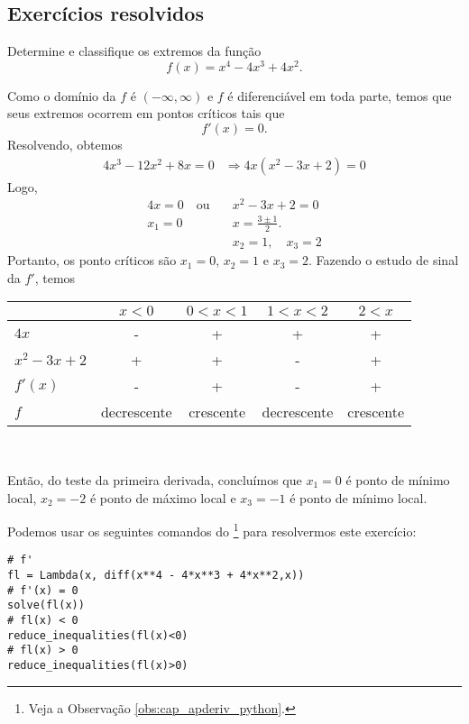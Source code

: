 \subsection{Exercícios resolvidos}


\begin{exeresol}
  Determine e classifique os extremos da função
  \begin{equation}
    f(x) = x^4 - 4x^3 + 4x^2.
  \end{equation}
\end{exeresol}
\begin{resol}
  Como o domínio da $f$ é $(-\infty, \infty)$ e $f$ é diferenciável em toda parte, temos que seus extremos ocorrem em pontos críticos tais que
  \begin{equation}
    f'(x)=0.
  \end{equation}
  Resolvendo, obtemos
  \begin{align}
    4x^3-12x^2+8x=0 &\Rightarrow 4x(x^2-3x+2)=0
  \end{align}
  Logo,
  \begin{align}
    4x=0 \quad\text{ou}\quad &x^2-3x+2=0\\
    x_1 = 0                  &x = \frac{3\pm 1}{2}. \\
                             &x_2 = 1,\quad x_3=2
  \end{align}
  Portanto, os ponto críticos são $x_1=0$, $x_2=1$ e $x_3=2$. Fazendo o estudo de sinal da $f'$, temos
  \begin{center}
    \begin{tabular}{lcccc}\hline
                 & $x<0$ & $0<x<1$ & $1<x<2$ & $2<x$ \\\hline
      $4x$       & -       &     +       &     +      &   +  \\
      $x^2-3x+2$ & +       &     +       &     -      &   +   \\
      $f'(x)$    & -       &     +       &     -      &   +   \\
      $f$        & decrescente & crescente & decrescente & crescente \\\hline
    \end{tabular}\\
  \end{center}
  Então, do teste da primeira derivada, concluímos que $x_1=0$ é ponto de mínimo local, $x_2=-2$ é ponto de máximo local e $x_3=-1$ é ponto de mínimo local.

  \ifispython
  Podemos usar os seguintes comandos do \sympy\footnote{Veja a Observação \ref{obs:cap_apderiv_python}.} para resolvermos este exercício:
\begin{verbatim}
# f'
fl = Lambda(x, diff(x**4 - 4*x**3 + 4*x**2,x))
# f'(x) = 0
solve(fl(x))
# fl(x) < 0
reduce_inequalities(fl(x)<0)
# fl(x) > 0
reduce_inequalities(fl(x)>0)
\end{verbatim}
  \fi
\end{resol}

